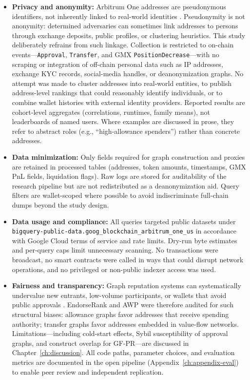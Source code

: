 \begin{itemize}
\item{}\label{sub:privacy-anonymity}
  \textbf{Privacy and anonymity:} Arbitrum One addresses are pseudonymous identifiers, not inherently linked to real-world identities . Pseudonymity is not anonymity: determined adversaries can sometimes link addresses to persons through exchange deposits, public profiles, or clustering heuristics. This study deliberately refrains from such linkage. Collection is restricted to on-chain events---\texttt{Approval}, \texttt{Transfer}, and GMX \texttt{PositionDecrease}---with no scraping or integration of off-chain personal data such as IP addresses, exchange KYC records, social-media handles, or deanonymization graphs. No attempt was made to cluster addresses into real-world entities, to publish address-level rankings that could reasonably identify individuals, or to combine wallet histories with external identity providers. Reported results are cohort-level aggregates (correlations, runtimes, family means), not leaderboards of named users. Where examples are discussed in prose, they refer to abstract roles (e.g., ``high-allowance spenders'') rather than concrete addresses.


\item{}\label{sub:data-minimization}
  \textbf{Data minimization:} Only fields required for graph construction and proxies are retained in processed tables (addresses, token amounts, timestamps, GMX PnL fields, liquidation flags). Raw logs are stored for auditability of the research pipeline but are not redistributed as a deanonymization aid. Query filters are wallet-scoped where possible to avoid indiscriminate full-chain dumps beyond the study design.


\item{}\label{sub:data-usage-compliance}
  \textbf{Data usage and compliance:} All queries targeted public datasets under \texttt{bigquery-public-data.goog\_blockchain\_arbitrum\_one\_us} in accordance with Google Cloud terms of service and rate limits. Dry-run byte estimates and per-query caps limit unnecessary scanning. No transactions were broadcast, no smart contracts were called in ways that could disrupt network operations, and no privileged or non-public indexer access was used.


\item{}\label{sub:fairness-transparency}
  \textbf{Fairness and transparency:} Graph reputation systems can systematically undervalue new entrants, low-volume participants, or wallets that avoid public approvals . EndorseRank and AWP were therefore audited for such structural biases: allowance graphs favor addresses that receive spending authority; transfer graphs favor addresses embedded in value-flow networks. Limitations---including cold-start effects, Sybil susceptibility of approval graphs, and construct overlap for GF-PR---are discussed in Chapter~\ref{ch:discussion}. All code paths, parameter choices, and evaluation metrics are documented in the open pipeline (Appendix~\ref{ch:appendix-eval}) to enable peer review and independent replication.



\end{itemize}
